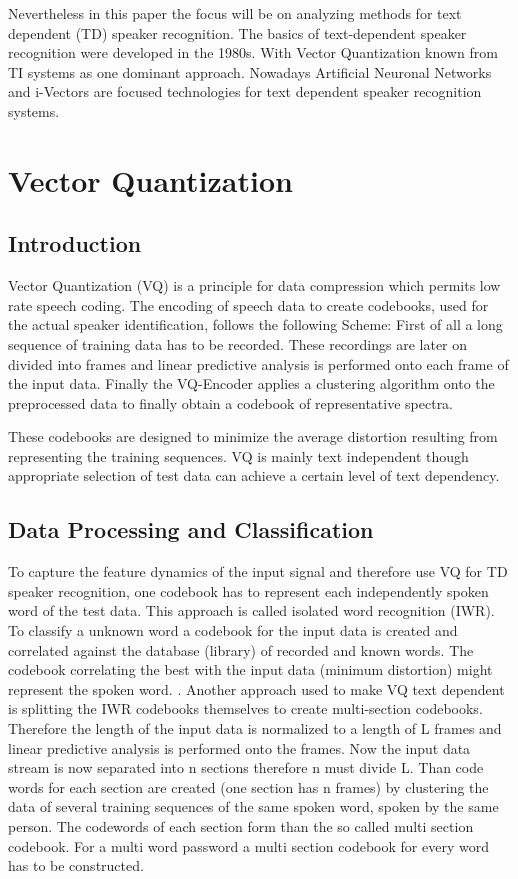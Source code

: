\documentclass[12pt]{article}
\begin{document}
Nevertheless in this paper the focus will be on analyzing methods for text dependent (TD) speaker recognition. The basics of text-dependent speaker recognition were developed in the 1980s. With Vector Quantization known from TI systems as one dominant approach. Nowadays Artificial Neuronal Networks and i-Vectors are focused technologies for text dependent speaker recognition systems.
 \section{Vector Quantization}
\subsection{Introduction}
Vector Quantization (VQ) is a principle for data compression which permits low rate speech coding. The encoding of speech data to create codebooks, used for the actual speaker identification,  follows the following Scheme: First of all a long sequence of training data has to be recorded. These recordings are later on divided into frames and linear predictive analysis is performed onto each frame of the input data.  Finally the VQ-Encoder applies a clustering algorithm onto the preprocessed data to finally obtain a codebook of representative spectra.\cite{vq}

These codebooks are designed to minimize the average distortion resulting from representing the training sequences.\cite{vq} \cite{compare}
VQ is mainly text independent though appropriate selection of test data can achieve a certain level of text dependency.\cite{compare}

\subsection{Data Processing and Classification}
To capture the feature dynamics of the input signal and therefore use VQ for TD speaker recognition, one codebook has to represent each independently spoken word of the test data. This approach is called isolated word recognition (IWR). 
To classify a unknown word  a codebook for the input data is created and correlated against the database (library) of recorded and known words. The codebook correlating the best with the input data (minimum distortion) might represent the spoken word. \cite{vq}. Another approach used to make VQ text dependent is splitting the IWR codebooks themselves to create multi-section codebooks. Therefore the length of the input data is normalized to a length of L frames and linear predictive analysis is performed onto the frames. Now the input data stream is now separated into n sections  therefore n must divide L.  Than code words for each section are created (one section has n frames) by clustering the data of several training sequences of the same  spoken word, spoken by the same person. 
The codewords of each section form than the so called multi section codebook. For a multi word password a multi section codebook for every word has to be constructed.\cite{vq}   
\end{document}
